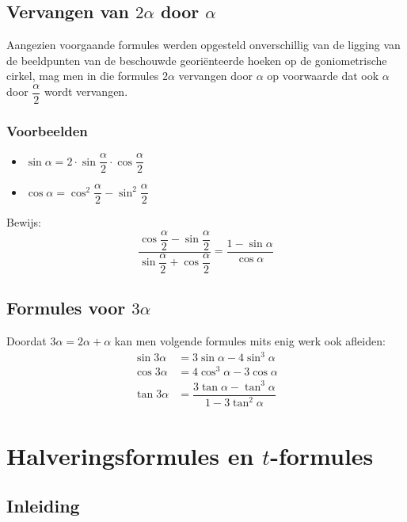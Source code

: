 \documentclass[a4paper,12pt]{article}
\begin{document}
\subsection{Vervangen van $2\alpha$ door $\alpha$}

Aangezien voorgaande formules werden opgesteld onverschillig van de ligging van de
beeldpunten van de beschouwde georiënteerde hoeken op de goniometrische cirkel,
mag men in die formules $2\alpha$ vervangen door $\alpha$ op voorwaarde dat ook
$\alpha$ door $\dfrac{\alpha}{2}$ wordt vervangen.

\subsubsection*{Voorbeelden}
\begin{itemize}
  \item $\sin\alpha = 2\cdot\sin\dfrac{\alpha}{2}\cdot\cos\dfrac{\alpha}{2}$
  \item $\cos\alpha = \cos^2\dfrac{\alpha}{2}-\sin^2\dfrac{\alpha}{2}$
\end{itemize}

\begin{oefening}
Bewijs:
$$\dfrac{\cos\dfrac{\alpha}{2}-\sin\dfrac{\alpha}{2}}{\sin\dfrac{\alpha}{2}+\cos\dfrac{\alpha}{2}}=\dfrac{1-\sin\alpha}{\cos\alpha}$$
\end{oefening}

\subsection{Formules voor $3\alpha$}

Doordat $3\alpha=2\alpha + \alpha$ kan men volgende formules mits enig werk ook afleiden:
\begin{align*}
  \sin 3\alpha &= 3\sin\alpha -4\sin^3\alpha\\
  \cos 3\alpha &= 4\cos^3\alpha -3\cos\alpha\\
  \tan 3\alpha &= \dfrac{3\tan\alpha -\tan^3\alpha}{1-3\tan^2\alpha}
\end{align*}

\pagebreak
\section{Halveringsformules en $t$-formules}

\subsection{Inleiding}
\end{document}
